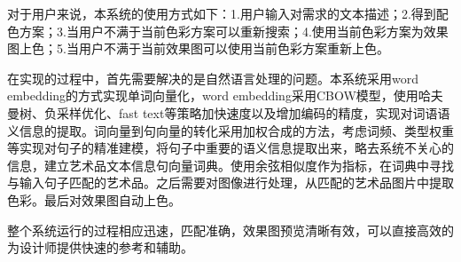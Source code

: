 对于用户来说，本系统的使用方式如下：1.用户输入对需求的文本描述；2.得到配色方案；3.当用户不满于当前色彩方案可以重新搜索；4.使用当前色彩方案为效果图上色；5.当用户不满于当前效果图可以使用当前色彩方案重新上色。

在实现的过程中，首先需要解决的是自然语言处理的问题。本系统采用word embedding的方式实现单词向量化，word embedding采用CBOW模型，使用哈夫曼树、负采样优化、fast text等策略加快速度以及增加编码的精度，实现对词语语义信息的提取。词向量到句向量的转化采用加权合成的方法，考虑词频、类型权重等实现对句子的精准建模，将句子中重要的语义信息提取出来，略去系统不关心的信息，建立艺术品文本信息句向量词典。使用余弦相似度作为指标，在词典中寻找与输入句子匹配的艺术品。之后需要对图像进行处理，从匹配的艺术品图片中提取色彩。最后对效果图自动上色。

整个系统运行的过程相应迅速，匹配准确，效果图预览清晰有效，可以直接高效的为设计师提供快速的参考和辅助。



